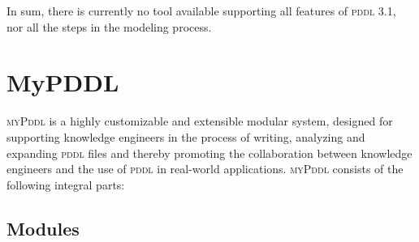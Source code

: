 \documentclass[runningheads]{llncs}
\newcommand{\mypddl}{\textsc{myPddl}\xspace}
\newcommand{\pddl}{\textsc{pddl}\xspace}
\begin{document}
In sum, there is currently no tool available supporting all features
of \pddl 3.1, nor all the steps in the modeling process.

\section{MyPDDL}
\label{sec:mypddl}

\mypddl is a highly customizable and extensible modular system,
designed for supporting knowledge engineers in the process of writing,
analyzing and expanding \pddl files and thereby promoting the
collaboration between knowledge engineers and the use of \pddl in
real-world applications. \mypddl consists of the following integral
parts:

\subsection{Modules}
\end{document}
